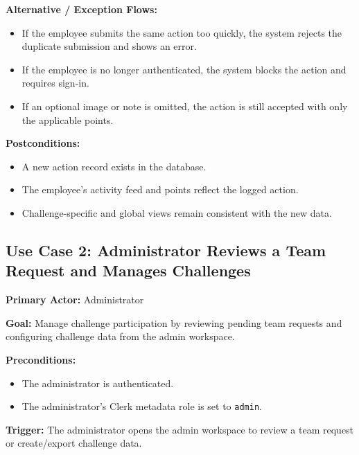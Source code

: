 \documentclass[12pt]{article}
\begin{document}
\textbf{Alternative / Exception Flows:}
\begin{itemize}[leftmargin=1.5em]
    \item If the employee submits the same action too quickly, the system
    rejects the duplicate submission and shows an error.
    \item If the employee is no longer authenticated, the system blocks the
    action and requires sign-in.
    \item If an optional image or note is omitted, the action is still
    accepted with only the applicable points.
\end{itemize}

\textbf{Postconditions:}
\begin{itemize}[leftmargin=1.5em]
    \item A new action record exists in the database.
    \item The employee's activity feed and points reflect the logged action.
    \item Challenge-specific and global views remain consistent with the new
    data.
\end{itemize}

\subsection{Use Case 2: Administrator Reviews a Team Request and Manages Challenges}

\textbf{Primary Actor:} Administrator

\textbf{Goal:} Manage challenge participation by reviewing pending team
requests and configuring challenge data from the admin workspace.

\textbf{Preconditions:}
\begin{itemize}[leftmargin=1.5em]
    \item The administrator is authenticated.
    \item The administrator's Clerk metadata role is set to
    \texttt{admin}.
\end{itemize}

\textbf{Trigger:} The administrator opens the admin workspace to review a team
request or create/export challenge data.
\end{document}
